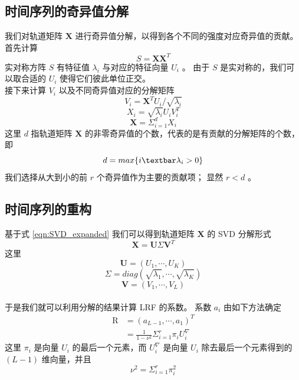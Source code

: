 \documentclass[a4paper]{article}
\begin{document}
\subsection{时间序列的奇异值分解}
我们对轨道矩阵 $\textbf{X}$ 进行奇异值分解，以得到各个不同的强度对应奇异值的贡献。
首先计算
\begin{equation}
	\label{eqn:S}
	S = \textbf{X} \textbf{X}^T
\end{equation}
实对称方阵 $S$ 有特征值 $\lambda_i$ 与对应的特征向量 $U_i$ 。
由于 $S$ 是实对称的，我们可以取合适的 $U_i$ 使得它们彼此单位正交。
\\
\indent 接下来计算 $V_i$ 以及不同奇异值对应的分解矩阵
\begin{equation}
	\label{eqn:V_i}
	V_i = \textbf{X}^T U_i / \sqrt{\lambda_i}
\end{equation}
\begin{equation}
	\label{eqn:X_i}
	\textbf{$X_i$} = \sqrt{\lambda_i} U_i V_i^T
\end{equation}
\begin{equation}
	\label{eqn:SVD_expanded}
	\textbf{X} = \Sigma_{i=1}^d \textbf{$X_i$}
\end{equation}
这里 $d$ 指轨道矩阵 $\textbf{X}$ 的非零奇异值的个数，代表的是有贡献的分解矩阵的个数，即
\begin{equation}
	\label{eqn:non-zero-char-d}
	d = max\{i \textbar \lambda_i > 0\}
\end{equation}
我们选择从大到小的前 $r$ 个奇异值作为主要的贡献项；
显然 $r < d$ 。
\subsection{时间序列的重构}
基于式 \ref{eqn:SVD_expanded} 我们可以得到轨道矩阵 $\textbf{X}$ 的 SVD 分解形式
\begin{equation}
	\label{eqn:SVD}
	\textbf{X} = \textbf{U} \Sigma \textbf{V}^T
\end{equation}
这里
\begin{equation}
	\label{eqn:SVD_U}
	\textbf{U} = (U_1, \cdots, U_K)
\end{equation}
\begin{equation}
	\label{eqn:SVD_Sigma}
	\Sigma = diag(\sqrt{\lambda_1}, \cdots, \sqrt{\lambda_K})
\end{equation}
\begin{equation}
	\label{eqn:SVD_V} 
	\textbf{V} = (V_1, \cdots, V_L)
\end{equation}
\\
\indent 于是我们就可以利用分解的结果计算 LRF 的系数。
系数 $a_i$ 由如下方法确定
\begin{align}
	\textrm{R} &= (a_{L-1}, \cdots, a_1)^T \\
	           &= \frac{1}{1-\nu^2} \Sigma_{i=1}^r \pi_i U_i^\nabla \label{eqn:R_a}
\end{align}
这里 $\pi_i$ 是向量 $U_i$ 的最后一个元素，而 $U_i^\nabla$ 是向量 $U_i$ 除去最后一个元素得到的 $(L-1)$ 维向量，并且
\begin{equation}
	\label{eqn:ssa_nu^2}
	\nu^2 = \Sigma_{i=1}^r \pi_i^2
\end{equation}
\end{document}
